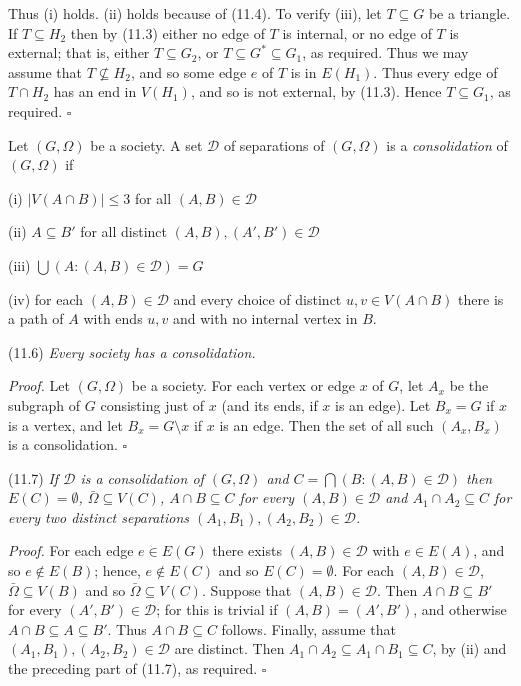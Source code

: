 Thus (i) holds. (ii) holds because of (11.4). To verify (iii), let $T \subseteq G$ be a triangle. If $T \subseteq H_2$ then by (11.3) either no edge of $T$ is internal, or no edge of $T$ is external; that is, either $T \subseteq G_2$, or $T \subseteq G^* \subseteq G_1$, as required. Thus we may assume that $T \not\subseteq H_2$, and so some edge $e$ of $T$ is in $E(H_1)$. Thus every edge of $T \cap H_2$ has an end in $V(H_1)$, and so is not external, by (11.3). Hence $T \subseteq G_1$, as required. $\square$

Let $(G, \Omega)$ be a society. A set $\mathcal{D}$ of separations of $(G, \Omega)$ is a \textit{consolidation} of $(G, \Omega)$ if

\hspace*{12pt}(i) $|V(A \cap B)| \le 3$ for all $(A, B) \in \mathcal{D}$

\hspace*{12pt}(ii) $A \subseteq B'$ for all distinct $(A, B), (A', B') \in \mathcal{D}$

\hspace*{12pt}(iii) $\bigcup (A: (A, B) \in \mathcal{D}) = G$

\hspace*{12pt}(iv) for each $(A, B) \in \mathcal{D}$ and every choice of distinct $u, v \in V(A \cap B)$ there is a path of $A$ with ends $u, v$ and with no internal vertex in $B$.

\stmt
(11.6) \textit{Every society has a consolidation.}

\textit{Proof.} Let $(G, \Omega)$ be a society. For each vertex or edge $x$ of $G$, let $A_x$ be the subgraph of $G$ consisting just of $x$ (and its ends, if $x$ is an edge). Let $B_x = G$ if $x$ is a vertex, and let $B_x = G \setminus x$ if $x$ is an edge. Then the set of all such $(A_x, B_x)$ is a consolidation. $\square$

\stmt
(11.7) \textit{If $\mathcal{D}$ is a consolidation of $(G, \Omega)$ and $C = \bigcap (B: (A, B) \in \mathcal{D})$ then $E(C) = \emptyset$, $\bar{\Omega} \subseteq V(C)$, $A \cap B \subseteq C$ for every $(A, B) \in \mathcal{D}$ and $A_1 \cap A_2 \subseteq C$ for every two distinct separations $(A_1, B_1), (A_2, B_2) \in \mathcal{D}$.}

\textit{Proof.} For each edge $e \in E(G)$ there exists $(A, B) \in \mathcal{D}$ with $e \in E(A)$, and so $e \notin E(B)$; hence, $e \notin E(C)$ and so $E(C) = \emptyset$. For each $(A, B) \in \mathcal{D}$, $\bar{\Omega} \subseteq V(B)$ and so $\bar{\Omega} \subseteq V(C)$. Suppose that $(A, B) \in \mathcal{D}$. Then $A \cap B \subseteq B'$ for every $(A', B') \in \mathcal{D}$; for this is trivial if $(A, B) = (A', B')$, and otherwise $A \cap B \subseteq A \subseteq B'$. Thus $A \cap B \subseteq C$ follows. Finally, assume that $(A_1, B_1), (A_2, B_2) \in \mathcal{D}$ are distinct. Then $A_1 \cap A_2 \subseteq A_1 \cap B_1 \subseteq C$, by (ii) and the preceding part of (11.7), as required. $\square$

